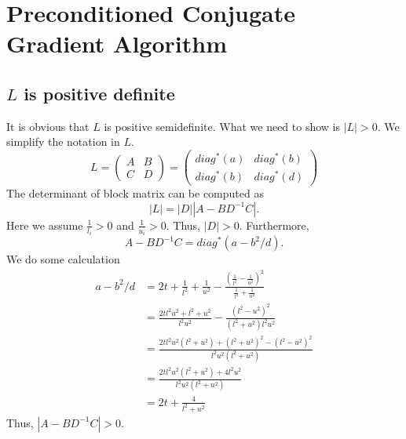 \documentclass{article}
\begin{document}
\section{Preconditioned Conjugate Gradient Algorithm}
\subsection{$L$ is positive definite}
It is obvious that $L$ is positive semidefinite. What we need to show is $|L|>0$. We simplify the notation in $L$.
\begin{equation}\label{L}
    L = \begin{pmatrix}
        A & B\\
        C & D
    \end{pmatrix} = \begin{pmatrix}
        diag^*(a) & diag^*(b)\\
        diag^*(b) & diag^*(d)
    \end{pmatrix}
\end{equation}
The determinant of block matrix can be computed as
\begin{equation}
    |L| = |D||A-BD^{-1}C|.
\end{equation}
Here we assume $\frac{1}{l_i}>0$ and $\frac{1}{u_i}>0$. Thus, $|D|>0$. Furthermore,
\begin{equation}
    A - BD^{-1}C = diag^*\left(a-b^2/d\right).
\end{equation}
We do some calculation
\begin{equation}
\begin{aligned}
     a-b^2/d &= 2t+\frac{1}{l^2}+\frac{1}{u^2} - \frac{\left(\frac{1}{l^2}-\frac{1}{u^2}\right)^2}{\frac{1}{l^2}+\frac{1}{u^2}}\\
     &= \frac{2tl^2u^2+l^2+u^2}{l^2u^2} - \frac{(l^2-u^2)^2}{(l^2+u^2)l^2u^2}\\
     & = \frac{2tl^2u^2(l^2+u^2)+(l^2+u^2)^2-(l^2-u^2)^2}{l^2u^2(l^2+u^2)}\\
     & = \frac{2tl^2u^2(l^2+u^2)+4l^2u^2}{l^2u^2(l^2+u^2)}\\
     & = 2t+\frac{4}{l^2+u^2}
\end{aligned}
\end{equation}
Thus, $|A-BD^{-1}C|>0$.
\end{document}

